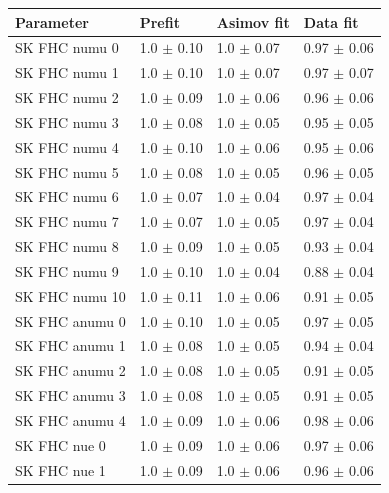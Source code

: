\begin{table}[ht!]
  \center
  \begin{tabular}{llll}
    \toprule
    Parameter & Prefit & \Gls{Asimov} fit & Data fit \\\midrule

    \Gls{SK} \Gls{FHC} \Gls{numu} 0& 1.0 $\pm$ 0.10 & 1.0 $\pm$ 0.07 & 0.97 $\pm$ 0.06 \\ 
    \Gls{SK} \Gls{FHC} \Gls{numu} 1& 1.0 $\pm$ 0.10 & 1.0 $\pm$ 0.07 & 0.97 $\pm$ 0.07 \\ 
    \Gls{SK} \Gls{FHC} \Gls{numu} 2& 1.0 $\pm$ 0.09 & 1.0 $\pm$ 0.06 & 0.96 $\pm$ 0.06 \\ 
    \Gls{SK} \Gls{FHC} \Gls{numu} 3& 1.0 $\pm$ 0.08 & 1.0 $\pm$ 0.05 & 0.95 $\pm$ 0.05 \\ 
    \Gls{SK} \Gls{FHC} \Gls{numu} 4& 1.0 $\pm$ 0.10 & 1.0 $\pm$ 0.06 & 0.95 $\pm$ 0.06 \\ 
    \Gls{SK} \Gls{FHC} \Gls{numu} 5& 1.0 $\pm$ 0.08 & 1.0 $\pm$ 0.05 & 0.96 $\pm$ 0.05 \\ 
    \Gls{SK} \Gls{FHC} \Gls{numu} 6& 1.0 $\pm$ 0.07 & 1.0 $\pm$ 0.04 & 0.97 $\pm$ 0.04 \\ 
    \Gls{SK} \Gls{FHC} \Gls{numu} 7& 1.0 $\pm$ 0.07 & 1.0 $\pm$ 0.05 & 0.97 $\pm$ 0.04 \\ 
    \Gls{SK} \Gls{FHC} \Gls{numu} 8& 1.0 $\pm$ 0.09 & 1.0 $\pm$ 0.05 & 0.93 $\pm$ 0.04 \\ 
    \Gls{SK} \Gls{FHC} \Gls{numu} 9& 1.0 $\pm$ 0.10 & 1.0 $\pm$ 0.04 & 0.88 $\pm$ 0.04 \\ 
    \Gls{SK} \Gls{FHC} \Gls{numu} 10& 1.0 $\pm$ 0.11 & 1.0 $\pm$ 0.06 & 0.91 $\pm$ 0.05 \\ 
    \Gls{SK} \Gls{FHC} \Gls{anumu} 0& 1.0 $\pm$ 0.10 & 1.0 $\pm$ 0.05 & 0.97 $\pm$ 0.05 \\ 
    \Gls{SK} \Gls{FHC} \Gls{anumu} 1& 1.0 $\pm$ 0.08 & 1.0 $\pm$ 0.05 & 0.94 $\pm$ 0.04 \\ 
    \Gls{SK} \Gls{FHC} \Gls{anumu} 2& 1.0 $\pm$ 0.08 & 1.0 $\pm$ 0.05 & 0.91 $\pm$ 0.05 \\ 
    \Gls{SK} \Gls{FHC} \Gls{anumu} 3& 1.0 $\pm$ 0.08 & 1.0 $\pm$ 0.05 & 0.91 $\pm$ 0.05 \\ 
    \Gls{SK} \Gls{FHC} \Gls{anumu} 4& 1.0 $\pm$ 0.09 & 1.0 $\pm$ 0.06 & 0.98 $\pm$ 0.06 \\ 
    \Gls{SK} \Gls{FHC} \Gls{nue} 0& 1.0 $\pm$ 0.09 & 1.0 $\pm$ 0.06 & 0.97 $\pm$ 0.06 \\ 
    \Gls{SK} \Gls{FHC} \Gls{nue} 1& 1.0 $\pm$ 0.09 & 1.0 $\pm$ 0.06 & 0.96 $\pm$ 0.06 \\ 

\end{tabular}
\end{table}

